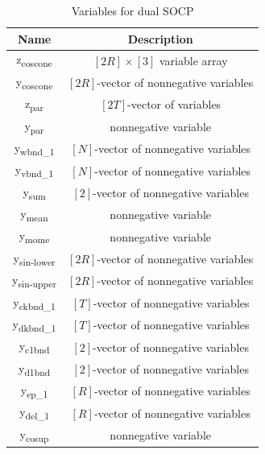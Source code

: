 \documentclass[12pt]{article}
\numberwithin{equation}{section}
\begin{document}
\begin{table}[h!] \centering
\scriptsize
 \begin{tabular}{| c |c|} 
 
 
 \hline
          Name & Description  \\ 
 \hline
 \hline
    
    z\textsubscript{coscone} & $[2R] \times [3]$ variable array \\
    y\textsubscript{coscone} & $[2R]$-vector of nonnegative variables \\
    \hline
        z\textsubscript{par} & $[2T]$-vector of variables\\
    y\textsubscript{par} & nonnegative variable \\
    \hline
        y\textsubscript{wbnd\_1} &$[N]$-vector of nonnegative variables\\
      \hline
              y\textsubscript{vbnd\_1} &$[N]$-vector of nonnegative variables\\
      \hline
        y\textsubscript{sum} &  $[2]$-vector of nonnegative variables\\
          \hline
        y\textsubscript{mean} & nonnegative variable \\
          \hline
        y\textsubscript{mome} & nonnegative variable \\
          \hline
        y\textsubscript{sin-lower} &  $[2R]$-vector of nonnegative variables \\
          \hline
        y\textsubscript{sin-upper} &  $[2R]$-vector of nonnegative variables\\
          \hline
        y\textsubscript{ckbnd\_1} & $ [T]$-vector of nonnegative variables \\
          \hline
        y\textsubscript{dkbnd\_1} & $[T]$-vector of nonnegative variables\\
          \hline
        y\textsubscript{c1bnd} &$[2]$-vector of nonnegative variables \\
          \hline
        y\textsubscript{d1bnd} & $[2]$-vector of nonnegative variables \\
          \hline
        y\textsubscript{ep\_1} & $ [R]$-vector of nonnegative variables \\
          \hline
        y\textsubscript{del\_1} & $[R]$-vector of nonnegative variables\\
          \hline
        y\textsubscript{cosup} & nonnegative variable \\
  
\hline
\end{tabular}


\caption{Variables for dual SOCP}
\label{socpdualvar}
\end{table}
\end{document}
